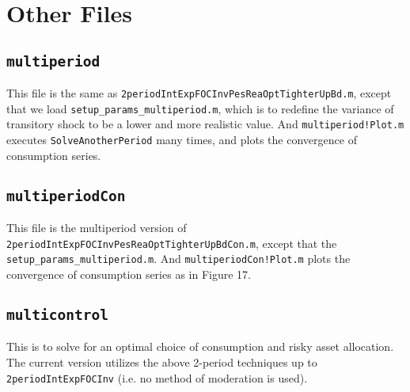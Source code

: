 \documentclass[titlepage,abstract]{\econtex}
\begin{document}
%

\section{Other Files}

\subsection{\texttt{multiperiod}}
This file is the same as \texttt{2periodIntExpFOCInvPesReaOptTighterUpBd.m}, except that we load \texttt{setup\_params\_multiperiod.m}, which is to redefine the variance of transitory shock to be a lower and more realistic value. And \texttt{multiperiod!Plot.m} executes \texttt{SolveAnotherPeriod} many times, and plots the convergence of consumption series.

\subsection{\texttt{multiperiodCon}}
This file is the multiperiod version of \texttt{2periodIntExpFOCInvPesReaOptTighterUpBdCon.m}, except that the \texttt{setup\_params\_multiperiod.m}. And \texttt{multiperiodCon!Plot.m} plots the convergence of consumption series as in Figure 17.

\subsection{\texttt{multicontrol}}
This is to solve for an optimal choice of consumption and risky asset allocation. The current version utilizes the above 2-period techniques up to \texttt{2periodIntExpFOCInv} (i.e. no method of moderation is used).
\end{document}
